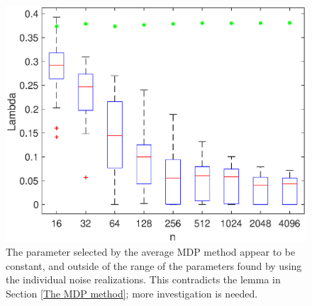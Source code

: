 \documentclass[12pt]{article}
\begin{document}
\begin{figure}
\centering
\includegraphics[width=\textwidth]{Figures/MDP_LamPlot1D_F1_S15_W100_R20.eps}
\caption{The parameter selected by the average MDP method appear to be constant, and outside of the range of the parameters found by using the individual noise realizations. This contradicts the lemma in Section \ref{The MDP method}; more investigation is needed.}
\label{fig:MDPlambdas}
\end{figure}



\end{document}
